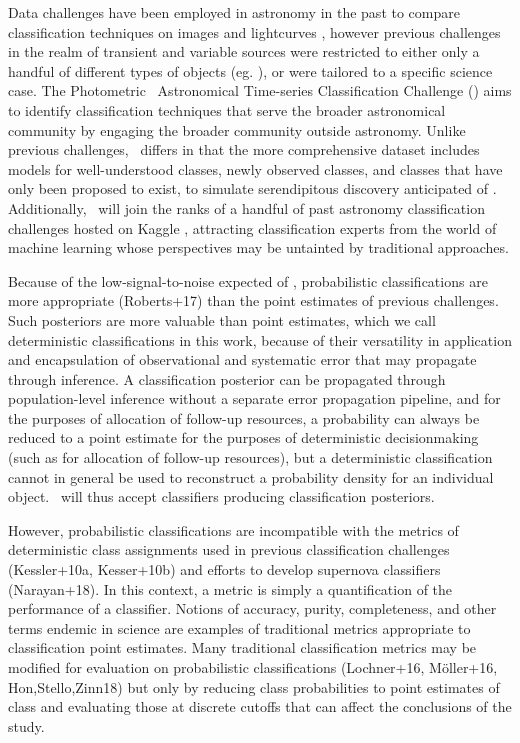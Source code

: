 Data challenges have been employed in astronomy in the past to compare classification techniques on images  and lightcurves , however previous challenges in the realm of transient and variable sources were restricted to either only a handful of different types of objects (eg. \snphotcc), or were tailored to a specific science case.
The Photometric \lsst\ Astronomical Time-series Classification Challenge (\plasticc) aims to identify classification techniques that serve the broader astronomical community by engaging the broader community outside astronomy.
Unlike previous challenges, \plasticc\ differs in that the more comprehensive dataset includes models for well-understood classes, newly observed classes, and classes that have only been proposed to exist, to simulate serendipitous discovery anticipated of \lsst.
Additionally, \plasticc\ will join the ranks of a handful of past astronomy classification challenges hosted on Kaggle , attracting classification experts from the world of machine learning whose perspectives may be untainted by traditional approaches.

Because of the low-signal-to-noise expected of \lsst, probabilistic classifications are more appropriate (Roberts+17) than the point estimates of previous challenges.
Such posteriors are more valuable than point estimates, which we call deterministic classifications in this work, because of their versatility in application and encapsulation of observational and systematic error that may propagate through inference.
A classification posterior can be propagated through population-level inference without a separate error propagation pipeline, and for the purposes of allocation of follow-up resources, a probability can always be reduced to a point estimate for the purposes of deterministic decisionmaking (such as for allocation of follow-up resources), but a deterministic classification cannot in general be used to reconstruct a probability density for an individual object.
\plasticc\ will thus accept classifiers producing classification posteriors.

However, probabilistic classifications are incompatible with the metrics of deterministic class assignments used in previous classification challenges (Kessler+10a, Kesser+10b) and efforts to develop supernova classifiers (Narayan+18).
In this context, a metric is simply a quantification of the performance of a classifier.
Notions of accuracy, purity, completeness, and other terms endemic in science are examples of traditional metrics appropriate to classification point estimates.
Many traditional classification metrics may be modified for evaluation on probabilistic classifications (Lochner+16, M\"{o}ller+16, Hon,Stello,Zinn18) but only by reducing class probabilities to point estimates of class and evaluating those at discrete cutoffs that can affect the conclusions of the study.

